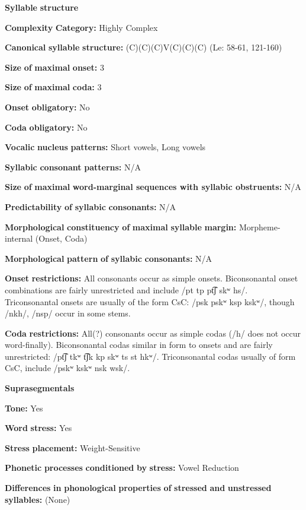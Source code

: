 \textbf{Syllable} \textbf{structure}

\textbf{Complexity} \textbf{Category:} Highly Complex

\textbf{Canonical} \textbf{syllable} \textbf{structure:} (C)(C)(C)V(C)(C)(C) (Le\citealt{Sourd1993}: 58-61, 121-160)

\textbf{Size} \textbf{of} \textbf{maximal} \textbf{onset:} 3

\textbf{Size} \textbf{of} \textbf{maximal} \textbf{coda:} 3

\textbf{Onset} \textbf{obligatory:} No

\textbf{Coda} \textbf{obligatory:} No

\textbf{Vocalic} \textbf{nucleus} \textbf{patterns:} Short vowels, Long vowels

\textbf{Syllabic} \textbf{consonant} \textbf{patterns:} N/A

\textbf{Size} \textbf{of} \textbf{maximal} \textbf{word{}-marginal sequences with syllabic obstruents:} N/A

\textbf{Predictability} \textbf{of} \textbf{syllabic} \textbf{consonants:} N/A

\textbf{Morphological} \textbf{constituency} \textbf{of} \textbf{maximal} \textbf{syllable} \textbf{margin:} Morpheme-internal (Onset, Coda)

\textbf{Morphological} \textbf{pattern} \textbf{of} \textbf{syllabic} \textbf{consonants:} N/A

\textbf{Onset} \textbf{restrictions:} All consonants occur as simple onsets. Biconsonantal onset combinations are fairly unrestricted and include /pt tp pt͡ʃ skʷ hs/. Triconsonantal onsets are usually of the form CsC: /psk pskʷ ksp kskʷ/, though /nkh/, /nsp/ occur in some stems.

\textbf{Coda} \textbf{restrictions:} All(?) consonants occur as simple codas (/h/ does not occur word-finally). Biconsonantal codas similar in form to onsets and are fairly unrestricted: /pt͡ʃ tkʷ t͡ʃk kp skʷ ts st hkʷ/. Triconsonantal codas usually of form CsC, include /pskʷ kskʷ nsk wsk/.

\textbf{Suprasegmentals}

\textbf{Tone:} Yes

\textbf{Word} \textbf{stress:} Yes

\textbf{Stress} \textbf{placement:} Weight-Sensitive

\textbf{Phonetic} \textbf{processes} \textbf{conditioned} \textbf{by} \textbf{stress:} Vowel Reduction

\textbf{Differences} \textbf{in} \textbf{phonological} \textbf{properties} \textbf{of} \textbf{stressed} \textbf{and} \textbf{unstressed} \textbf{syllables:} (None)

